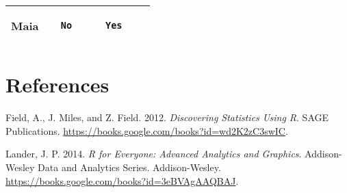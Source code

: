 \documentclass[
]{article}
\begin{document}
\begin{longtable}[]{@{}ccccc@{}}
\begin{minipage}[t]{0.13\columnwidth}
Maia\strut
\end{minipage} & \begin{minipage}[t]{0.21\columnwidth}\centering
\begin{verbatim}
  No
\end{verbatim}
\strut
\end{minipage} & \begin{minipage}[t]{0.21\columnwidth}\centering
\begin{verbatim}
    Yes
\end{verbatim}
\strut
\end{minipage} & \begin{minipage}[t]{0.12\columnwidth}\centering
7052\strut
\end{minipage}\tabularnewline
\bottomrule
\end{longtable}

\hypertarget{references}{%
\section*{References}\label{references}}

\hypertarget{refs}{}
\leavevmode\hypertarget{ref-field2012discovering}{}%
Field, A., J. Miles, and Z. Field. 2012. \emph{Discovering Statistics
Using R}. SAGE Publications.
\url{https://books.google.com/books?id=wd2K2zC3swIC}.

\leavevmode\hypertarget{ref-lander2014r}{}%
Lander, J. P. 2014. \emph{R for Everyone: Advanced Analytics and
Graphics}. Addison-Wesley Data and Analytics Series. Addison-Wesley.
\url{https://books.google.com/books?id=3eBVAgAAQBAJ}.
\end{document}
